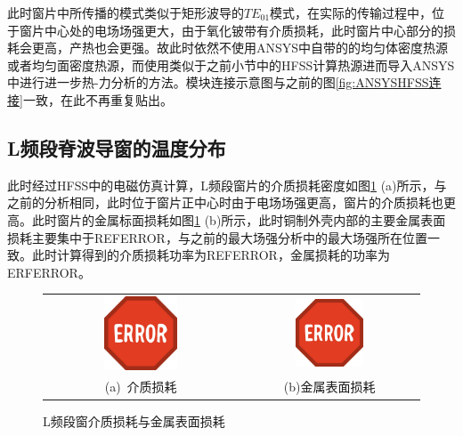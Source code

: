 \documentclass[master]{thesis-uestc}
\begin{document}
此时窗片中所传播的模式类似于矩形波导的\(TE_{01}\)模式，在实际的传输过程中，位于窗片中心处的电场场强更大，由于氧化铍带有介质损耗，此时窗片中心部分的损耗会更高，产热也会更强。故此时依然不使用ANSYS中自带的的均匀体密度热源或者均匀面密度热源，而使用类似于之前小节中的HFSS计算热源进而导入ANSYS中进行进一步热-力分析的方法。模块连接示意图与之前的图\ref{fig:ANSYSHFSS连接}一致，在此不再重复贴出。

\subsection{L频段脊波导窗的温度分布}
此时经过HFSS中的电磁仿真计算，L频段窗片的介质损耗密度如图\ref{fig:L体损耗与面损耗} (a)所示，与之前的分析相同，此时位于窗片正中心时由于电场场强更高，窗片的介质损耗也更高。此时窗片的金属标面损耗如图\ref{fig:L体损耗与面损耗} (b)所示，此时铜制外壳内部的主要金属表面损耗主要集中于REFERROR，与之前的最大场强分析中的最大场强所在位置一致。此时计算得到的介质损耗功率为REFERROR，金属损耗的功率为ERFERROR。
\begin{figure}[!htb]
    \small
    \centering
    \begin{tabular}{@{\ }c@{\ }c}
        \includegraphics[width=0.4\textwidth]{pic/ERROR.jpg} & 
        \hspace{5pt}
        \includegraphics[width=0.4\textwidth]{pic/ERROR.jpg}     \\
        \mbox{\small (a) 介质损耗}                                                                               & 
        \mbox{\small (b)金属表面损耗}                                                                                  \\
    \end{tabular}
    \caption{L频段窗介质损耗与金属表面损耗}
    \label{fig:L体损耗与面损耗}
\end{figure}
\end{document}

